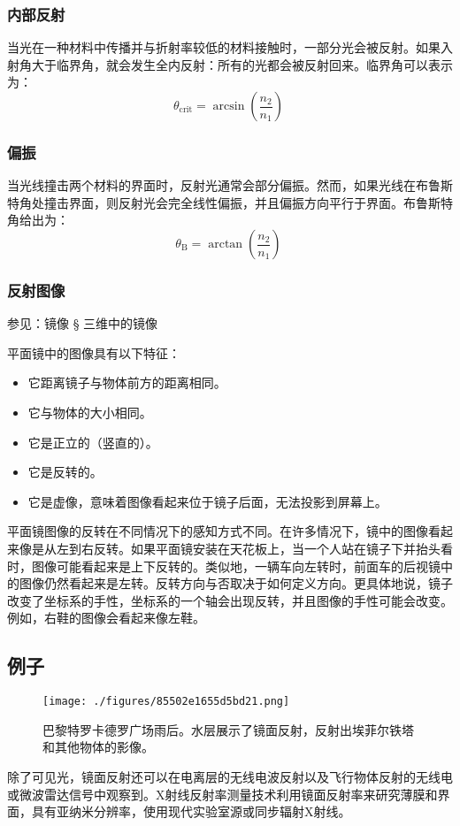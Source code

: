 \subsubsection{内部反射}

当光在一种材料中传播并与折射率较低的材料接触时，一部分光会被反射。如果入射角大于临界角，就会发生全内反射：所有的光都会被反射回来。临界角可以表示为：
\[
\theta_{\text{crit}} = \arcsin \left(\frac{n_2}{n_1}\right)~
\]
\subsubsection{偏振}
当光线撞击两个材料的界面时，反射光通常会部分偏振。然而，如果光线在布鲁斯特角处撞击界面，则反射光会完全线性偏振，并且偏振方向平行于界面。布鲁斯特角给出为：
\[
\theta_{\mathrm{B}} = \arctan \left(\frac{n_2}{n_1}\right)~
\]
\subsubsection{反射图像}

参见：镜像 § 三维中的镜像

平面镜中的图像具有以下特征：
\begin{itemize}
\item 它距离镜子与物体前方的距离相同。
\item 它与物体的大小相同。
\item 它是正立的（竖直的）。
\item 它是反转的。
\item 它是虚像，意味着图像看起来位于镜子后面，无法投影到屏幕上。
\end{itemize}
平面镜图像的反转在不同情况下的感知方式不同。在许多情况下，镜中的图像看起来像是从左到右反转。如果平面镜安装在天花板上，当一个人站在镜子下并抬头看时，图像可能看起来是上下反转的。类似地，一辆车向左转时，前面车的后视镜中的图像仍然看起来是左转。反转方向与否取决于如何定义方向。更具体地说，镜子改变了坐标系的手性，坐标系的一个轴会出现反转，并且图像的手性可能会改变。例如，右鞋的图像会看起来像左鞋。
\subsection{例子}
\begin{figure}[ht]
\centering
\texttt{[image: ./figures/85502e1655d5bd21.png]}
\caption{巴黎特罗卡德罗广场雨后。水层展示了镜面反射，反射出埃菲尔铁塔和其他物体的影像。} \label{fig_JMFS_5}
\end{figure}
除了可见光，镜面反射还可以在电离层的无线电波反射以及飞行物体反射的无线电或微波雷达信号中观察到。X射线反射率测量技术利用镜面反射率来研究薄膜和界面，具有亚纳米分辨率，使用现代实验室源或同步辐射X射线。

